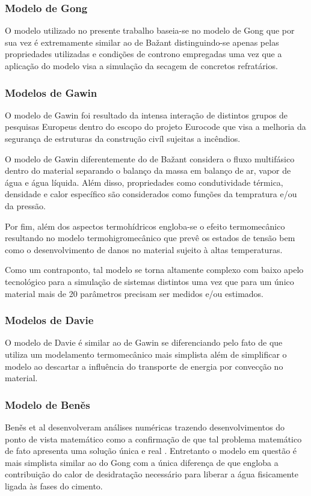 \subsubsection{Modelo de Gong}
O modelo utilizado no presente trabalho baseia-se no modelo de Gong
\cite{Gong1995a} que por sua vez é extremamente similar ao de Ba\v{z}ant
distinguindo-se apenas pelas propriedades utilizadas e condições de controno
empregadas uma vez que a aplicação do modelo visa a simulação da secagem de
concretos refratários.
    
    
\subsubsection{Modelos de Gawin}
O modelo de Gawin\cite{Gawin1999} foi resultado da intensa interação de
distintos grupos de pesquisas Europeus dentro do escopo do projeto Eurocode
\cite{Eurocode} que visa a melhoria da segurança de estruturas da construção
civíl sujeitas a incêndios.

O modelo de Gawin diferentemente do de Ba\v{z}ant considera o fluxo multifásico
dentro do material separando o balanço da massa em balanço de ar, vapor de água
e água líquida. Além disso, propriedades como condutividade térmica, densidade e
calor específico são considerados como funções da tempratura e/ou da pressão.

Por fim, além dos aspectos termohídricos engloba-se o efeito termomecânico
resultando no modelo termohigromecânico que prevê os estados de tensão bem como
o desenvolvimento de danos no material sujeito à altas temperaturas.

Como um contraponto, tal modelo se torna altamente complexo com baixo apelo
tecnológico para a simulação de sistemas distintos uma vez que para um único
material mais de 20 parâmetros precisam ser medidos e/ou estimados.
    
\subsubsection{Modelos de Davie}
O modelo de Davie é similar ao de Gawin se diferenciando pelo fato de que
utiliza um modelamento termomecânico mais simplista além de simplificar o modelo
ao descartar a influência do transporte de energia por convecção no material.
    
\subsubsection{Modelo de Ben\v{e}s}
Ben\v{e}s et al desenvolveram análises numéricas trazendo desenvolvimentos do
ponto de vista matemático como a confirmação de que tal problema matemático de
fato apresenta uma solução única e real \cite{Benes2013a}. Entretanto o modelo
em questão é mais simplista similar ao do Gong com a única diferença de que
engloba a contribuição do calor de desidratação necessário para liberar a água
fisicamente ligada às fases do cimento.
    
